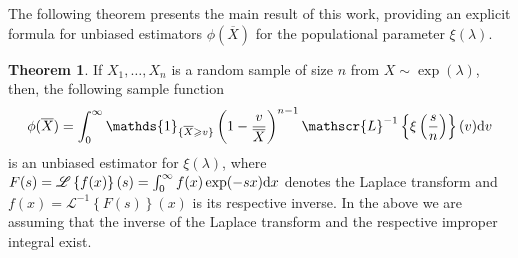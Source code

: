 \documentclass[12pt]{article}
\theoremstyle{definition}
\newtheorem{theorem}{Theorem}[section]
\begin{document}
\smallskip 


The following theorem presents the main result of this work, providing an explicit formula for unbiased estimators $\phi(\overline{X})$ %
for the populational parameter $\xi(\lambda)$.

\begin{theorem}\label{main theorem}
	If $X_1,\ldots,X_n$ is a random sample of size $n$ from $X\sim\exp(\lambda)$, then, the following sample function
	\begin{align}\label{final-exp}
		\phi(\overline{X})
		=
		\int_0^{\infty} 
		\mathds{1}_{\{\overline{X}\geqslant v\}}
		\left(1-{v\over \overline{X}}\right)^{n-1} 
		\mathscr{L}^{-1}\left\{\xi\left({s\over n}\right)
		\right\}(v){\rm d}v
	\end{align}
	is an unbiased estimator for $\xi(\lambda)$, where $F(s)=\mathscr{L}\left\{f(x)\right\}(s)=\int_0^\infty f(x)\exp(-sx){\rm d}x$ denotes the Laplace transform and $f(x)=\mathscr{L}^{-1}\left\{F(s)\right\}(x)$ is its respective inverse.  In the above we are assuming that the inverse of the Laplace transform and the respective improper integral exist.
\end{theorem}
\end{document}
